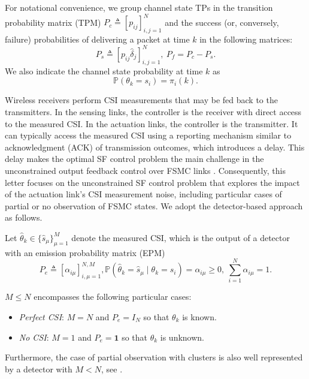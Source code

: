\documentclass[journal,twoside,web]{ieeecolor}
\begin{document}
For notational convenience, we group
channel state TPs in the transition probability matrix (TPM) $P_{c}^{} \triangleq \left[p_{ij}\right]_{i,j=1}^{N}$
and the  success (or, conversely, failure) probabilities of delivering a packet at time $k$ in the following matrices:
\begin{equation}\label{eq:Ps}
    P_{s}^{} \triangleq \left[p_{ij}\hat{\delta}_{j}\right]_{i,j=1}^{N},~P_{f} = P_{c} - P_{s}.
\end{equation}
We also indicate the channel state probability at time $k$ as
\begin{equation}\label{eq:pik}
     \mathbb{P}(\theta_{k} = s_i) = \pi_{i}(k).
\end{equation}

Wireless receivers perform CSI measurements that may be fed back to the transmitters. In the sensing links, the controller is the receiver with direct access to the measured CSI. In the actuation links, the controller is the transmitter. It can typically access the measured CSI using a reporting mechanism similar to acknowledgment (ACK) of transmission outcomes, which introduces a delay. This delay makes the optimal SF control problem the main challenge in the unconstrained output feedback control over FSMC links \cite{impicciatore2024tac}. Consequently, this letter focuses on the unconstrained SF control problem that explores the impact of the actuation link's CSI measurement noise, including particular cases of partial or no observation of FSMC states. We adopt the detector-based approach as follows.

Let $\hat{\theta}_k \in \{\hat{s}_{\mu}\}_{\mu=1}^{M}$ denote the measured CSI, which is the output of a detector with an emission probability matrix (EPM)
\begin{subequations}\label{eq:epm-alpha}
\begin{equation}\label{eq:epm}
    P_{e}^{} \triangleq \left[\alpha_{i\mu}\right]_{i,\mu=1}^{N,M},
\end{equation}
\begin{equation}\label{eq:alpha}
   \mathbb{P}(\hat{\theta}_{k} = \hat{s}_{\mu} \mid \theta_{k} = s_i) = \alpha_{i\mu} \geq 0,~ \sum_{i=1}^N \alpha_{i\mu}= 1.
\end{equation}
\end{subequations}

$M\leq N$ encompasses the following particular cases:
\begin{itemize}
    \item \emph{Perfect CSI}: $M=N$ and $P_e = I_N$ so that %
    $\theta_k$ is known.
    \item \emph{No CSI}: $M=1$ and $P_e = \mathbf{1}$ so that $\theta_k$ is unknown.
\end{itemize}
Furthermore, the case of partial observation with clusters is also well represented by a detector with $M<N$, see \cite{costa2015detector}.
\end{document}

